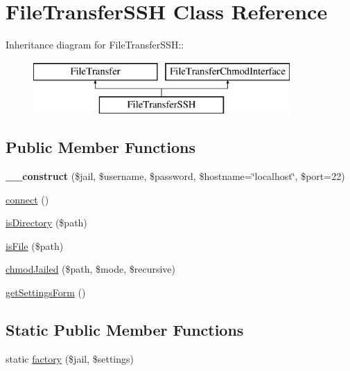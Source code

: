 \hypertarget{classFileTransferSSH}{
\section{FileTransferSSH Class Reference}
\label{classFileTransferSSH}
}
Inheritance diagram for FileTransferSSH::\begin{figure}[H]
\begin{center}
\leavevmode
\includegraphics[height=2cm]{classFileTransferSSH}
\end{center}
\end{figure}
\subsection*{Public Member Functions}
\begin{DoxyCompactItemize}
\item 
\hypertarget{classFileTransferSSH_a5d793fbdc570d5ea8edbd41e4b389f39}{
{\bfseries \_\-\_\-construct} (\$jail, \$username, \$password, \$hostname=\char`\"{}localhost\char`\"{}, \$port=22)}
\label{classFileTransferSSH_a5d793fbdc570d5ea8edbd41e4b389f39}

\item 
\hyperlink{classFileTransferSSH_a3b153dcb920f531962fc4d4339683be8}{connect} ()
\item 
\hyperlink{classFileTransferSSH_aa7bbccd688eb0dcd05684d4f1cceeee1}{isDirectory} (\$path)
\item 
\hyperlink{classFileTransferSSH_afa2f90d55ba7e385ec44698d44e48c8a}{isFile} (\$path)
\item 
\hyperlink{classFileTransferSSH_adb2f9be936419a0f28593552d1856c24}{chmodJailed} (\$path, \$mode, \$recursive)
\item 
\hyperlink{classFileTransferSSH_a56142f1f2a4e513a727fb4cc2a029e74}{getSettingsForm} ()
\end{DoxyCompactItemize}
\subsection*{Static Public Member Functions}
\begin{DoxyCompactItemize}
\item 
static \hyperlink{classFileTransferSSH_afafbb0a5ffc2799cd926f38b87ea5e41}{factory} (\$jail, \$settings)
\end{DoxyCompactItemize}
